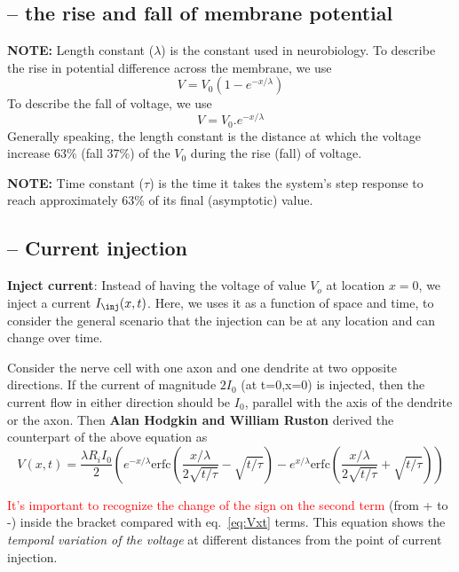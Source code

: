 \subsection{-- the rise and fall of membrane potential}

\begin{mdframed}

{\bf NOTE:} Length constant ($\lambda$) is the constant used in
neurobiology. To describe the rise in potential difference across the
membrane, we use
\begin{equation}
  V = V_0 (1-e^{-x/\lambda})
\end{equation}
To describe the fall of voltage, we use
\begin{equation}
  V = V_0 . e^{-x/\lambda}
\end{equation}
Generally speaking, the length constant is the distance at which the
voltage increase 63\% (fall 37\%) of the $V_0$ during the rise (fall)
of voltage.
\end{mdframed}


{\bf NOTE:} Time constant ($\tau$) is the time it takes the system's
step response to reach approximately 63\% of its final (asymptotic)
value.

\subsection{-- Current injection}

{\bf Inject current}: Instead of having the voltage of value $V_o$ at location
$x=0$, we inject a current $I_\inj(x,t)$. Here, we uses it as a function
of space and time, to consider the general scenario that the injection can
be at any location and can change over time.

Consider the nerve cell with one axon and one dendrite at two opposite
directions. If the current of magnitude $2I_0$ (at t=0,x=0) is injected, then
the current flow in either direction should be $I_0$, parallel with the axis of
the dendrite or the axon. Then {\bf Alan Hodgkin and William Ruston} derived the
counterpart of the above equation as
\begin{equation}
  V(x,t) = \frac{\lambda R_i I_0}{2}\left( e^{-x/\lambda}
    \text{erfc}(\frac{x/\lambda}{2\sqrt{t/\tau}}-\sqrt{t/\tau}) 
    - e^{x/\lambda} \text{erfc}(\frac{x/\lambda}{2\sqrt{t/\tau}}+\sqrt{t/\tau}) 
    \right)
\end{equation}

\textcolor{red}{It's important to recognize the change of the sign on the second
term} (from + to -) inside the bracket compared with eq.~\eqref{eq:Vxt} terms.
This equation shows the {\it temporal variation of the voltage} at different
distances from the point of current injection.

